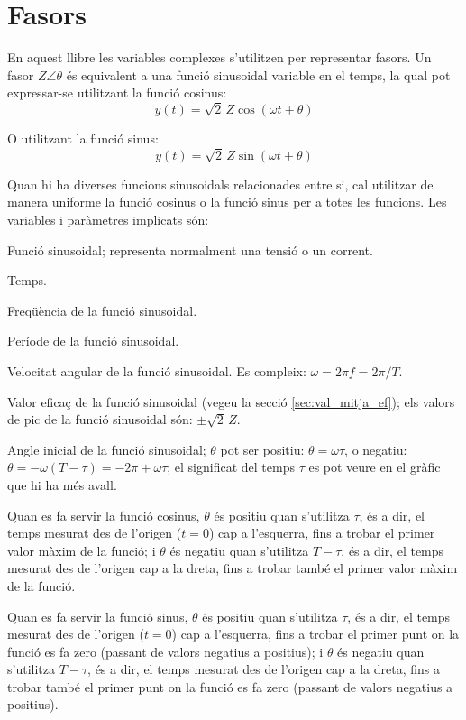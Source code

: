 \section*{Fasors}  \label{sec:fasors}

En aquest llibre les variables complexes s'utilitzen per representar fasors. Un fasor $Z\angle\theta$ és equivalent a una funció sinusoidal variable en el temps, la qual pot expressar-se utilitzant la funció cosinus:
\[y(t)=\sqrt{2}\, Z \cos(\omega t + \theta)\]

O utilitzant la funció sinus:
\[y(t)=\sqrt{2}\, Z \sin(\omega t + \theta)\]

Quan hi ha diverses funcions sinusoidals relacionades entre si, cal utilitzar de manera uniforme la funció cosinus o la funció sinus per a totes les funcions. Les variables i paràmetres implicats són:
\begin{list}{}
{\setlength{\labelwidth}{15mm} \setlength{\leftmargin}{20mm}
\setlength{\labelsep}{5mm}}
    \item[$y(t)$] Funció sinusoidal; representa normalment una tensió o un corrent.
    \item[$t$] Temps.
    \item[$f$] Freqüència de la funció sinusoidal.
    \item[$T$] Període de la funció sinusoidal.
    \item[$\omega$] Velocitat angular de la funció sinusoidal. Es compleix: $\omega = 2 \pi f = 2 \pi/T$.
    \item[$Z$] Valor eficaç de la funció sinusoidal (vegeu la secció \vref{sec:val_mitja_ef}); els valors de pic de la funció sinusoidal  són:  $\pm\sqrt{2}\, Z$.
    \item[$\theta$] Angle inicial de la funció sinusoidal;  $\theta$ pot ser positiu: $\theta=\omega \tau$, o negatiu: $\theta = -\omega (T-\tau) = -2\pi + \omega \tau$; el significat del temps $\tau$  es pot veure en el gràfic que hi ha més avall.

    Quan es fa servir la funció cosinus, $\theta$ és positiu quan s'utilitza $\tau$, és a dir, el temps mesurat  des de l'origen ($t=0$) cap a l'esquerra, fins a trobar el primer valor màxim de la funció; i $\theta$ és negatiu quan s'utilitza $T-\tau$, és a dir, el temps mesurat des de l'origen cap a la dreta, fins a trobar també el primer valor màxim de la funció.

    Quan es fa servir la funció sinus, $\theta$ és positiu quan s'utilitza $\tau$, és a dir, el temps mesurat des de l'origen ($t=0$) cap a l'esquerra, fins a trobar el primer punt on la funció es fa zero (passant de valors negatius a positius); i $\theta$ és negatiu quan s'utilitza $T-\tau$, és a dir, el temps mesurat des de l'origen cap a la dreta, fins a trobar també el primer punt on la funció es fa zero (passant de valors negatius a positius).
    \item[] 
\end{list}


